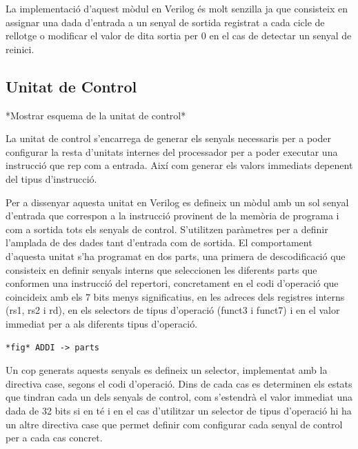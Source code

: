 \documentclass[10pt,a4paper,twocolumn,twoside]{article}
\begin{document}
    La implementació d'aquest mòdul en Verilog és molt senzilla ja que consisteix en assignar una dada d'entrada a un senyal de sortida registrat a cada cicle de rellotge o modificar el valor de dita sortia per 0 en el cas de detectar un senyal de reinici. 
    
    
    \subsection{Unitat de Control}
    *Mostrar esquema de la unitat de control*
    
    La unitat de control s'encarrega de generar els senyals necessaris per a poder configurar la resta d'unitats internes del processador per a poder executar una instrucció que rep com a entrada. Així com generar els valors immediats depenent del tipus d'instrucció. 
    
    Per a dissenyar aquesta unitat en Verilog es defineix un mòdul amb un sol senyal d'entrada que correspon a la instrucció provinent de la memòria de programa i com a sortida tots els senyals de control. S'utilitzen paràmetres per a definir l'amplada de des dades tant d'entrada com de sortida.
    El comportament d'aquesta unitat s'ha programat en dos parts, una primera de descodificació que consisteix en definir senyals interns que seleccionen les diferents parts que conformen una instrucció del repertori, concretament en el codi d'operació que coincideix amb els 7 bits menys significatius, en les adreces dels registres interns (rs1, rs2 i rd), en els selectors de tipus d'operació (funct3 i funct7) i en el valor immediat per a als diferents tipus d'operació.
    
    \verb|*fig* ADDI -> parts|
    
    Un cop generats aquests senyals es defineix un selector, implementat amb la directiva case, segons el codi d'operació. Dins de cada cas es determinen els estats que tindran cada un dels senyals de control, com s'estendrà el valor immediat una dada de 32 bits si en té i en el cas d'utilitzar un selector de tipus d'operació hi ha un altre directiva case que permet definir com configurar cada senyal de control per a cada cas concret.
    
    
    
    
    
\end{document}
